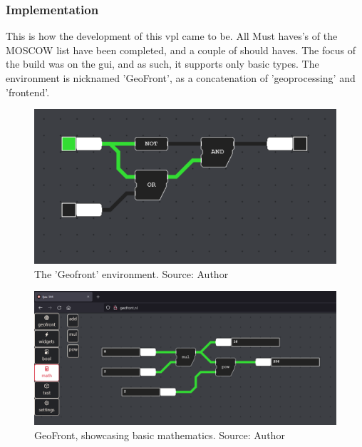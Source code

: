 \subsubsection{Implementation}

This is how the development of this \ac{vpl} came to be. All Must haves's of the MOSCOW list have been completed, and a couple of should haves. The focus of the build was on the \ac{gui}, and as such, it supports only basic types. The environment is nicknamed 'GeoFront', as a concatenation of 'geoprocessing' and 'frontend'. 

\begin{figure}[!tbp]
  \centering
  \begin{minipage}[b]{1.0\textwidth}
    \includegraphics[width=\textwidth]{../images/geofront-1.PNG}
    \caption{The 'Geofront' environment. Source: Author}
    \label{fig:geofront-1}
  \end{minipage}
\end{figure}


\begin{figure}[!tbp]
  \centering
  \begin{minipage}[b]{1.0\textwidth}
    \includegraphics[width=\textwidth]{../images/geofront-2.PNG}
    \caption{GeoFront, showcasing basic mathematics. Source: Author}
    \label{fig:geofront-2}
  \end{minipage}
\end{figure}


